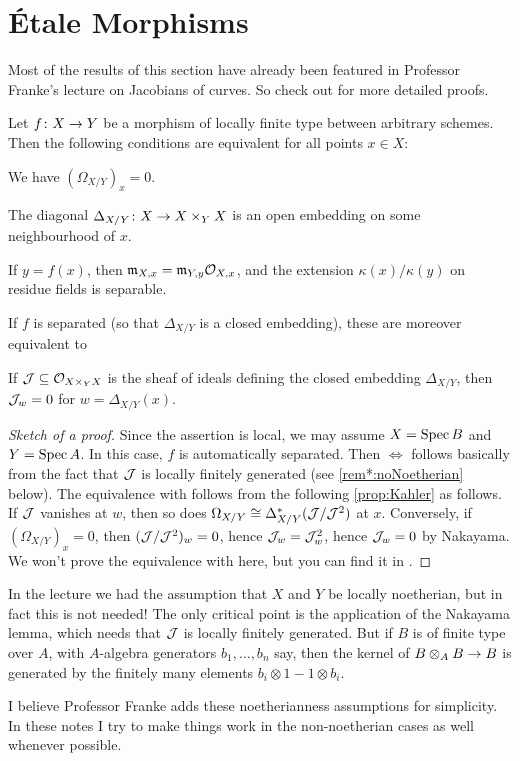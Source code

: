 \section{Étale Morphisms}
Most of the results of this section have already been featured in Professor Franke's lecture on Jacobians of curves. So check out \cite[Section~2.7]{jacobians} for more detailed proofs.
\begin{prop}\label{prop:unramified}
	Let $f\colon X\morphism Y$ be a morphism of locally finite type between arbitrary schemes. Then the following conditions are equivalent for all points $x\in X$:
	\begin{alphanumerate}
		\item We have $(\Omega_{X/Y})_x=0$.
		\item The diagonal $\Delta_{X/Y}\colon X\morphism X\times_YX$ is an open embedding on some neighbourhood of $x$.
		\item If $y=f(x)$, then $\mathfrak{m}_{X,x}=\mathfrak{m}_{Y,y}\mathcal{O}_{X,x}$, and the extension $\kappa(x)/\kappa(y)$ on residue fields is separable.
	\end{alphanumerate}
	If $f$ is separated (so that $\Delta_{X/Y}$ is a closed embedding), these are moreover equivalent to
	\begin{alphanumerate}\setcounter{enumi}{3}
		\item If $\mathcal{J}\subseteq \mathcal{O}_{X\times_YX}$ is the sheaf of ideals defining the closed embedding $\Delta_{X/Y}$, then $\mathcal{J}_w=0$ for $w=\Delta_{X/Y}(x)$.
	\end{alphanumerate}
\end{prop}
\begin{proof}[Sketch of a proof]
	Since the assertion is local, we may assume $X=\operatorname{Spec} B$ and $Y=\operatorname{Spec} A$. In this case, $f$ is automatically separated. Then  $\Leftrightarrow$  follows basically from the fact that $\mathcal{J}$ is locally finitely generated (see \cref{rem*:noNoetherian} below). The equivalence with  follows from the following \cref{prop:Kahler} as follows. If $\mathcal{J}$ vanishes at $w$, then so does $\Omega_{X/Y}\cong \Delta_{X/Y}^*(\mathcal{J}/\mathcal{J}^2)$ at $x$. Conversely, if $(\Omega_{X/Y})_x=0$, then $(\mathcal{J}/\mathcal{J}^2)_w=0$, hence $\mathcal{J}_w=\mathcal{J}_w^2$, hence $\mathcal{J}_w=0$ by Nakayama. We won't prove the equivalence with  here, but you can find it in \cite[Lemma~2.7.2]{jacobians}.
\end{proof}
\begin{rem*}\label{rem*:noNoetherian}
	In the lecture we had the assumption that $X$ and $Y$ be locally noetherian, but in fact this is not needed! The only critical point is the application of the Nakayama lemma, which needs that $\mathcal{J}$ is locally finitely generated. But if $B$ is of finite type over $A$, with $A$-algebra generators $b_1,\dotsc,b_n$ say, then the kernel of $B\otimes_AB\morphism B$ is generated by the finitely many elements $b_i\otimes 1-1\otimes b_i$.
	
	I believe Professor Franke adds these noetherianness assumptions for simplicity. In these notes I try to make things work in the non-noetherian cases as well whenever possible.
\end{rem*}
